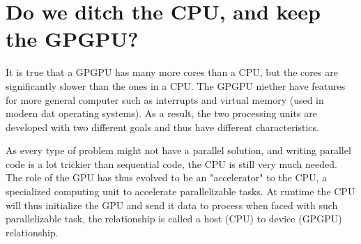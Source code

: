 \section{Do we ditch the CPU, and keep the GPGPU?}
\label{sec:cpu vs gpu}

It is true that a GPGPU has many more cores than a CPU, but the cores are significantly slower than the ones in a CPU.
The GPGPU niether have features for more general computer such as interrupts and virtual memory (used in modern dat operating systems).
As a result, the two processing units are developed with two different goals and thus have different characteristics.

As every type of problem might not have a parallel solution, and writing parallel code is a lot trickier than sequential code, the CPU is still very much needed.
The role of the GPU has thus evolved to be an "accelerator" to the CPU, a specialized computing unit to accelerate parallelizable tasks.
At runtime the CPU will thus initialize the GPU and send it data to process when faced with such parallelizable task, the relationship is called a host (CPU) to device (GPGPU) relationship.
